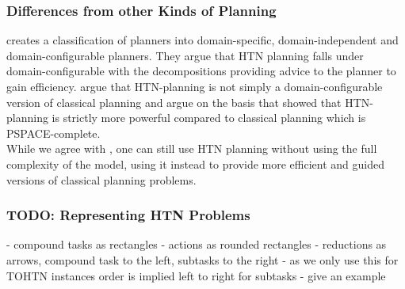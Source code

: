 \begin{comment}
\cite{erol1994htn}
- complexity depends on
	1. existence/ ordering of non-primitive tasks in task networks
	2. total order (or not) of tasks
	3. whether variables are allowed
- general HTN planning (non-primitive tasks are allowed, no guaranteed total order, variables are allowed) -> undecidable
- TOHTN planning (variables allowed, arbitrary non-primitive tasks) -> D-EXPTIME, EXPSPACE-hard
 
- context free grammars play a role, can be simulated in HTN

\cite{erol1996complexity}
- undecidable for HTN, D-EXPTIME and PSPACE-hard for TOHTN

both: context-free grammars can be simulated by HTN, use primitive tasks as terminals, abstract tasks as non-terminals, methods as grammar rules

\cite{holler2014language}
- TOHTN planning problems correspond to context free grammars

\cite{behnke2015complexity}
- HTN plan verification is NP-complete
- this even holds if the list of decompositions is provided
\end{comment}


\subsubsection{Differences from other Kinds of Planning}
\cite{nau2007current} creates a classification of planners into domain-specific, domain-independent and domain-configurable planners.
They argue that HTN planning falls under domain-configurable with the decompositions providing advice to the planner to gain efficiency.
\cite{holler2020htn} argue that HTN-planning is not simply a domain-configurable version of classical planning and argue on the basis that \cite{erol1994htn, erol1996complexity} showed that HTN-planning is strictly more powerful compared to classical planning which is PSPACE-complete. \\
While we agree with \cite{holler2020htn}, one can still use HTN planning without using the full complexity of the model, using it instead to provide more efficient and guided versions of classical planning problems.

\subsubsection{TODO: Representing HTN Problems}
- compound tasks as rectangles
- actions as rounded rectangles
- reductions as arrows, compound task to the left, subtasks to the right
- as we only use this for TOHTN instances order is implied left to right for subtasks
- give an example